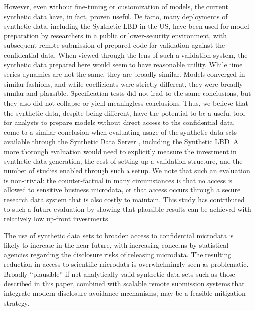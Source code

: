 \documentclass[10pt,twoside]{article}
\begin{document}
However, even without  fine-tuning or customization of models, the current synthetic data have, in fact, proven useful. De facto, many deployments of synthetic data, including the Synthetic LBD in the US, have been used for model preparation by researchers in a public or lower-security environment, with subsequent remote submission of prepared code for validation against the confidential data. When viewed through the lens of such a validation system, the synthetic data prepared here would seem to have reasonable utility. While time series dynamics are not the same, they are broadly similar. Models converged in similar fashions, and while coefficients were strictly different, they were broadly similar and plausible. Specification tests did not lead to the same conclusions, but they also did not collapse or yield meaningless conclusions. Thus, we believe that the synthetic data, despite being different, have the potential to be a useful tool for analysts to prepare models without direct access to the confidential data. \textcite{VilhuberAbowd2016-SOLE,Vilhuber2019-SGP} come to a similar conclusion when evaluating usage of the synthetic data sets available through the Synthetic Data Server \citep{AbowdVilhuber2010}, including the Synthetic LBD. A more thorough evaluation would need to explicitly measure the investment in synthetic data generation, the cost of setting up a validation structure, and the number of studies enabled through such a setup. We note that such an evaluation is non-trivial: the counter-factual in many circumstances is that no access is allowed to sensitive business microdata, or that access occurs through a secure research data system that is also costly to maintain. This study has contributed to such a future evaluation by showing that plausible results can be achieved with relatively low up-front investments.
 
The use of synthetic data sets to broaden access to confidential microdata is likely to increase in the near future, with increasing concerns by statistical agencies regarding the disclosure risks of releasing microdata. The resulting reduction in access to scientific microdata is overwhelmingly seen as problematic. Broadly ``plausible'' if not analytically valid synthetic data sets such as those described in this paper, combined with scalable remote submission systems that integrate modern disclosure avoidance mechanisms, may be a feasible mitigation strategy. 
 
\end{document}
